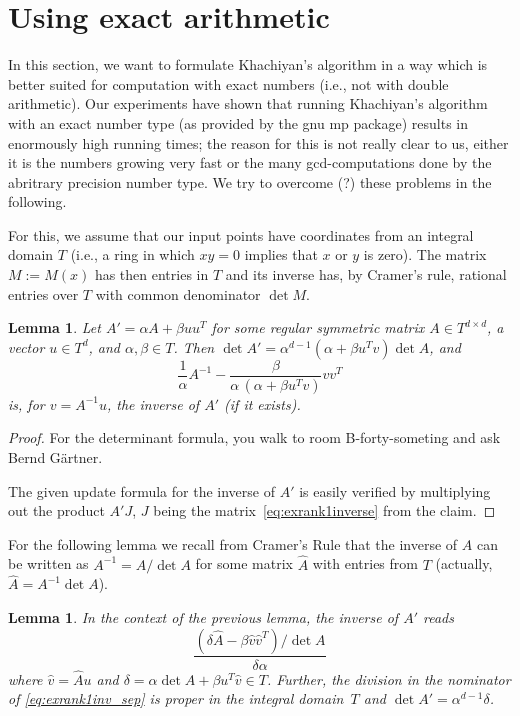 \documentclass[a4paper,twocolumn]{article}
\newtheorem{lemma}[theorem]{Lemma}
\begin{document}
\section{Using exact arithmetic}

In this section, we want to formulate Khachiyan's algorithm in a way
which is better suited for computation with exact numbers (i.e., not
with double arithmetic).  Our experiments have shown that running
Khachiyan's algorithm with an exact number type (as provided by the
{\sc gnu mp} package) results in enormously high running times; the
reason for this is not really clear to us, either it is the numbers
growing very fast or the many gcd-computations done by the abritrary
precision number type.  We try to overcome (?) these problems in the
following.

For this, we assume that our input points have coordinates from an
integral domain $T$ (i.e., a ring in which $xy=0$ implies that $x$ or
$y$ is zero).  The matrix $M:= M(x)$ has then entries in $T$ and its
inverse has, by Cramer's rule, rational entries over $T$ with common
denominator $\det M$.
%
\begin{lemma}
  Let $A'=\alpha A + \beta uu^T$ for some regular symmetric matrix
  $A\in T^{d\times d}$, a vector $u\in T^d$, and $\alpha,\beta\in
  T$.  Then $\det A' = \alpha^{d-1}(\alpha+\beta u^Tv) \det A$, and
  \begin{equation}
    \label{eq:exrank1inverse}
    \frac{1}{\alpha} A^{-1} -
    \frac{\beta}{\alpha\,(\alpha+\beta u^T v)}vv^T
  \end{equation}
  is, for $v = A^{-1} u$, the inverse of $A'$ (if it exists).
\end{lemma}
%
\begin{proof}
  For the determinant formula, you walk to room B-forty-someting and
  ask Bernd G\"artner.

  The given update formula for the inverse of $A'$ is easily verified
  by multiplying out the product $A' J$, $J$ being the
  matrix~\eqref{eq:exrank1inverse} from the claim.
\end{proof}
%
For the following lemma we recall from Cramer's Rule that the inverse
of $A$ can be written as $A^{-1} = \hat{A} / \det{A}$ for some matrix
$\hat{A}$ with entries from $T$ (actually, $\hat{A} = A^{-1}
\det{A}$).
%
\begin{lemma}
  \label{lemma:rank1update}
  In the context of the previous lemma, the inverse of $A'$ reads
  \begin{equation}
    \label{eq:exrank1inv_sep}
    \frac{(\delta \hat{A} - \beta\hat{v}\hat{v}^T)/\det{A}}%
	 {\delta\alpha}
  \end{equation}
  where $\hat{v} = \hat{A} u$ and $\delta = \alpha \det{A} + \beta
  u^T\hat{v}\in T$.  Further, the division in the nominator of
  \eqref{eq:exrank1inv_sep} is proper in the integral domain~$T$ and
  $\det{A'} = \alpha^{d-1} \delta$.
\end{lemma}
\end{document}
